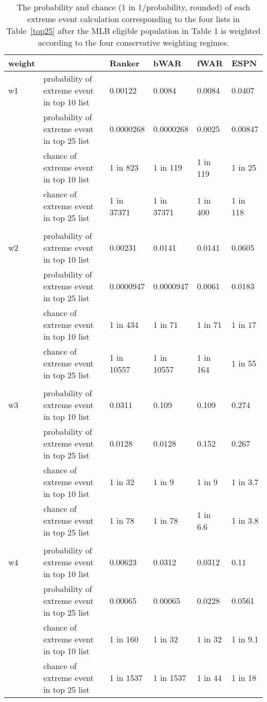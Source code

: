 \documentclass[11pt]{article}\usepackage[]{graphicx}\usepackage[]{color}
\begin{document}
\begin{table}[h!]
\begin{center}
\begin{tabular}{llllll}
\hline
 weight & &  Ranker  &  bWAR  &  fWAR  &  ESPN \\
 \hline
w1 & probability of extreme event in top 10 list 
  & 0.00122 
  & 0.0084 
  & 0.0084 
  & 0.0407 \\
& probability of extreme event in top 25 list 
  & 0.0000268 
  & 0.0000268 
  & 0.0025 
  & 0.00847 \\
& chance of extreme event in top 10 list 
  & 1 in 823 
  & 1 in 119 
  & 1 in 119 
  & 1 in 25 \\
& chance of extreme event in top 25 list 
  & 1 in 37371 
  & 1 in 37371 
  & 1 in 400 
  & 1 in 118 \\
  & & & & & \\
w2 & probability of extreme event in top 10 list 
  & 0.00231 
  & 0.0141 
  & 0.0141 
  & 0.0605 \\
& probability of extreme event in top 25 list 
  & 0.0000947 
  & 0.0000947 
  & 0.0061 
  & 0.0183 \\
& chance of extreme event in top 10 list 
  & 1 in 434 
  & 1 in 71 
  & 1 in 71 
  & 1 in 17 \\
& chance of extreme event in top 25 list 
  & 1 in 10557 
  & 1 in 10557 
  & 1 in 164 
  & 1 in 55 \\
  & & & & & \\
w3 & probability of extreme event in top 10 list 
  & 0.0311 
  & 0.109 
  & 0.109 
  & 0.274 \\
& probability of extreme event in top 25 list 
  & 0.0128 
  & 0.0128 
  & 0.152 
  & 0.267 \\
& chance of extreme event in top 10 list 
  & 1 in 32 
  & 1 in 9 
  & 1 in 9 
  & 1 in 3.7 \\
& chance of extreme event in top 25 list 
  & 1 in 78 
  & 1 in 78 
  & 1 in 6.6 
  & 1 in 3.8 \\
  & & & & & \\  
w4 & probability of extreme event in top 10 list 
  & 0.00623 
  & 0.0312 
  & 0.0312 
  & 0.11 \\
& probability of extreme event in top 25 list 
  & 0.00065 
  & 0.00065 
  & 0.0228 
  & 0.0561 \\
& chance of extreme event in top 10 list 
  & 1 in 160 
  & 1 in 32 
  & 1 in 32 
  & 1 in 9.1 \\
& chance of extreme event in top 25 list 
  & 1 in 1537 
  & 1 in 1537 
  & 1 in 44 
  & 1 in 18 \\
  \hline
\end{tabular}
\end{center}
\caption{The probability and chance (1 in 1/probability, rounded) 
  of each extreme event calculation corresponding to the four lists in 
  Table~\ref{top25} after the MLB eligible population in Table 1 is 
  weighted according to the four conservative weighting regimes.}
\label{probvalues.weights}
\end{table}
\end{document}
